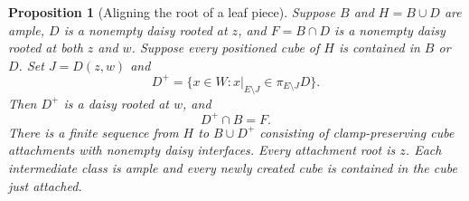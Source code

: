 \documentclass[11pt]{article}
\newtheorem{proposition}[theorem]{Proposition}
\theoremstyle{definition}
\begin{document}
\begin{proposition}[Aligning the root of a leaf piece]
\label{prop:leaf-root-alignment}
Suppose $B$ and $H=B\cup D$ are ample, $D$ is a nonempty daisy rooted
at $z$, and $F=B\cap D$ is a nonempty daisy rooted at both $z$ and $w$.
Suppose every positioned cube of $H$ is contained in $B$ or $D$.
Set $J=D(z,w)$ and
\[
 D^+=\{x\in W:x|_{E\setminus J}\in\pi_{E\setminus J}D\}.
\]
Then $D^+$ is a daisy rooted at $w$, and
\begin{equation}\label{eq:private-leaf-cylinder}
                  D^+\cap B=F.
\end{equation}
There is a finite sequence from $H$ to $B\cup D^+$ consisting of
clamp-preserving cube attachments with nonempty daisy interfaces.
Every attachment root is $z$. Each intermediate class is ample and
every newly created cube is contained in the cube just attached.
\end{proposition}
\end{document}
